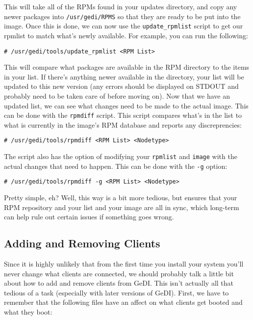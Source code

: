 \documentclass[10pt,a4paper,titlepage]{article}
\begin{document}
\begin{enumerate}
This will take all of the RPMs found in your updates directory, and copy any
newer packages into \verb!/usr/gedi/RPMS! so that they are ready to be put into
the image.  Once this is done, we can now use the \verb!update_rpmlist! script
to get our rpmlist to match what's newly available.  For example, you can run
the following:

\begin{verbatim}
# /usr/gedi/tools/update_rpmlist <RPM List>
\end{verbatim}

This will compare what packages are available in the RPM directory to the items
in your list.  If there's anything newer available in the directory, your list
will be updated to this new version (any errors should be displayed on STDOUT
and probably need to be taken care of before moving on).  Now that we have an
updated list, we can see what changes need to be made to the actual image.  This
can be done with the \verb!rpmdiff! script.  This script compares what's in the
list to what is currently in the image's RPM database and reports any
discreprencies:

\begin{verbatim}
# /usr/gedi/tools/rpmdiff <RPM List> <Nodetype>
\end{verbatim}

The script also has the option of modifying your \verb!rpmlist! and \verb!image!
with the actual changes that need to happen.  This can be done with the
\verb!-g! option:

\begin{verbatim}
# /usr/gedi/tools/rpmdiff -g <RPM List> <Nodetype>
\end{verbatim}

Pretty simple, eh?  Well, this way is a bit more tedious, but ensures that your
RPM repository and your list and your image are all in sync, which long-term
can help rule out certain issues if something goes wrong.
\end{enumerate}

\subsection{Adding and Removing Clients}
Since it is highly unlikely that from the first time you install your system
you'll never change what clients are connected, we should probably talk a little
bit about how to add and remove clients from GeDI.  This isn't actually all that
tedious of a task (especially with later versions of GeDI).  First, we have to
remember that the following files have an affect on what clients get booted and
what they boot:
\end{document}
